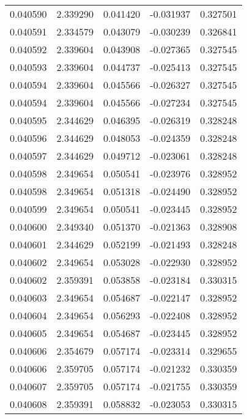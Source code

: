 \begin{tabular}{lrrrr}
0.040590    &  2.339290 &  0.041420 & -0.031937 &             0.327501 \\
0.040591    &  2.334579 &  0.043079 & -0.030239 &             0.326841 \\
0.040592    &  2.339604 &  0.043908 & -0.027365 &             0.327545 \\
0.040593    &  2.339604 &  0.044737 & -0.025413 &             0.327545 \\
0.040594    &  2.339604 &  0.045566 & -0.026327 &             0.327545 \\
0.040594    &  2.339604 &  0.045566 & -0.027234 &             0.327545 \\
0.040595    &  2.344629 &  0.046395 & -0.026319 &             0.328248 \\
0.040596    &  2.344629 &  0.048053 & -0.024359 &             0.328248 \\
0.040597    &  2.344629 &  0.049712 & -0.023061 &             0.328248 \\
0.040598    &  2.349654 &  0.050541 & -0.023976 &             0.328952 \\
0.040598    &  2.349654 &  0.051318 & -0.024490 &             0.328952 \\
0.040599    &  2.349654 &  0.050541 & -0.023445 &             0.328952 \\
0.040600    &  2.349340 &  0.051370 & -0.021363 &             0.328908 \\
0.040601    &  2.344629 &  0.052199 & -0.021493 &             0.328248 \\
0.040602    &  2.349654 &  0.053028 & -0.022930 &             0.328952 \\
0.040602    &  2.359391 &  0.053858 & -0.023184 &             0.330315 \\
0.040603    &  2.349654 &  0.054687 & -0.022147 &             0.328952 \\
0.040604    &  2.349654 &  0.056293 & -0.022408 &             0.328952 \\
0.040605    &  2.349654 &  0.054687 & -0.023445 &             0.328952 \\
0.040606    &  2.354679 &  0.057174 & -0.023314 &             0.329655 \\
0.040606    &  2.359705 &  0.057174 & -0.021232 &             0.330359 \\
0.040607    &  2.359705 &  0.057174 & -0.021755 &             0.330359 \\
0.040608    &  2.359391 &  0.058832 & -0.023053 &             0.330315 \\

\end{tabular}
